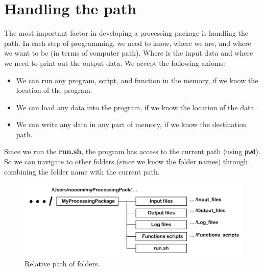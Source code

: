 \section{Handling the path}

The most important factor in developing a processing package is handling the path. In each step of programming, we need to know, where we are, and where we want to be (in terms of computer path). Where is the input data and where we need to print out the output data. We accept the following axioms:

\begin{itemize}
  \item We can run any program, script, and function in the memory, if we know the location of the program.
  \item We can load any data into the program, if we know the location of the data.
  \item We can write any data in any part of memory, if we know the destination path. 
\end{itemize}

\noindent
Since we run the \textbf{run.sh}, the program has access to the current path (using \texttt{pwd}). So we can navigate to other folders (since we know the folder names) through combining the folder name with the current path. 

\begin{figure} [ht]
\centering
\includegraphics[scale=0.6]{figures/pdf/Figure03.pdf} 
\caption{Relative path of folders.}
\label{fig:structure}
\end{figure}

